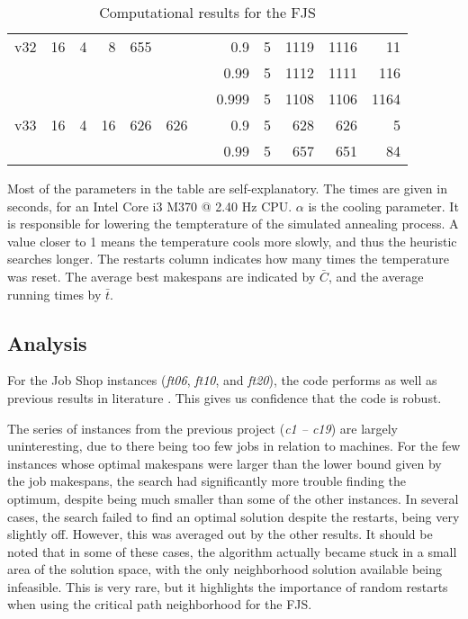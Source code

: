 \documentclass[a4paper,11pt]{article}
\begin{document}
\begin{table}
\begin{tabular}{@{\bfseries}rrrrrrrrrrrr}
	v32  & 16 &  4 &  8 &  655 &      &&    0.9 & 5 & 1119 & 1116 &   11 \\
	     &    &    &    &      &      &&   0.99 & 5 & 1112 & 1111 &  116 \\
	     &    &    &    &      &      &&  0.999 & 5 & 1108 & 1106 & 1164 \\[1ex]
	v33  & 16 &  4 & 16 &  626 &  626 &&    0.9 & 5 &  628 &  626 &    5 \\
	     &    &    &    &      &      &&   0.99 & 5 &  657 &  651 &   84 \\[1ex]
	\bottomrule
\end{tabular}
\caption{Computational results for the FJS}
\label{table:fjs}
\end{table}

Most of the parameters in the table are self-explanatory. The times are given in seconds, for an Intel Core i3 M370 @ 2.40 Hz CPU. $\alpha$ is the cooling parameter. It is responsible for lowering the tempterature of the simulated annealing process. A value closer to 1 means the temperature cools more slowly, and thus the heuristic searches longer. The restarts column indicates how many times the temperature was reset. The average best makespans are indicated by $\bar{C}$, and the average running times by $\bar{t}$.

\subsection{Analysis}

For the Job Shop instances (\emph{ft06}, \emph{ft10}, and \emph{ft20}), the code performs as well as previous results in literature \cite{simulatedannealingjsp}. This gives us confidence that the code is robust.

The series of instances from the previous project (\emph{c1 -- c19}) are largely uninteresting, due to there being too few jobs in relation to machines. For the few instances whose optimal makespans were larger than the lower bound given by the job makespans, the search had significantly more trouble finding the optimum, despite being much smaller than some of the other instances. In several cases, the search failed to find an optimal solution despite the restarts, being very slightly off. However, this was averaged out by the other results. It should be noted that in some of these cases, the algorithm actually became stuck in a small area of the solution space, with the only neighborhood solution available being infeasible. This is very rare, but it highlights the importance of random restarts when using the critical path neighborhood for the FJS.
\end{document}
